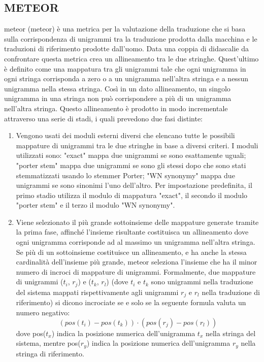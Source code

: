 \subsection{METEOR}
\acrshort{meteor} (\acrlong{meteor}) \cite{banerjee2005meteor} è una metrica per la valutazione della traduzione che si basa sulla corrispondenza di unigrammi tra la traduzione prodotta dalla macchina e le traduzioni di riferimento prodotte dall'uomo. 
Data una coppia di didascalie da confrontare questa metrica crea un allineamento tra le due stringhe. Quest'ultimo è definito come una mappatura tra gli unigrammi tale che ogni unigramma in ogni stringa corrisponda a zero o a un unigramma nell'altra stringa e a nessun unigramma nella stessa stringa. Così in un dato allineamento, un singolo unigramma in una stringa non può corrispondere a più di un unigramma nell'altra stringa. Questo allineamento è prodotto in modo incrementale attraverso una serie di stadi, i quali prevedono due fasi distinte:
\begin{enumerate}
\item Vengono usati dei moduli esterni diversi che elencano tutte le possibili mappature di unigrammi tra le due stringhe in base a diversi criteri. I moduli utilizzati sono: "exact" mappa due unigrammi se sono esattamente uguali; "porter stem" mappa due unigrammi se sono gli stessi dopo che sono stati stemmatizzati usando lo stemmer Porter; "WN synonymy" mappa due unigrammi se sono sinonimi l'uno dell'altro.
Per impostazione predefinita, il primo stadio utilizza il modulo di mappatura "exact", il secondo il modulo "porter stem" e il terzo il modulo "WN synonymy".
\item Viene selezionato il più grande sottoinsieme delle mappature generate tramite la prima fase, affinché l'insieme risultante costituisca un allineamento dove ogni unigramma corrisponde ad al massimo un unigramma nell'altra stringa. Se più di un sottoinsieme costituisce un allineamento, e ha anche la stessa cardinalità dell'insieme più grande, \acrshort{meteor} seleziona l'insieme che ha il minor numero di incroci di mappature di unigrammi. Formalmente, due mappature di unigrammi ($t_i$, $r_j$) e ($t_k$, $r_l$) (dove $t_i$ e $t_k$ sono unigrammi nella traduzione del sistema mappati rispettivamente agli unigrammi $r_j$ e $r_l$ nella traduzione di riferimento) si dicono incrociate se e solo se la seguente formula valuta un numero negativo:
\begin{equation*}
(pos(t_i) - pos(t_k)) \cdot (pos(r_j)-pos(r_l))
\end{equation*}
dove pos($t_x$) indica la posizione numerica dell'unigramma $t_x$ nella stringa del sistema, mentre pos($r_y$) indica la posizione numerica dell'unigramma $r_y$ nella stringa di riferimento. 
\end{enumerate}
